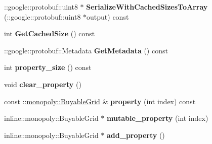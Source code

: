 \begin{DoxyCompactItemize}
\item 
\hypertarget{classmonopoly_1_1_all_buyable_grids_a4342c1c81350077923ce80b5f8d4b295}{}\+::google\+::protobuf\+::uint8 $\ast$ {\bfseries Serialize\+With\+Cached\+Sizes\+To\+Array} (\+::google\+::protobuf\+::uint8 $\ast$output) const \label{classmonopoly_1_1_all_buyable_grids_a4342c1c81350077923ce80b5f8d4b295}

\item 
\hypertarget{classmonopoly_1_1_all_buyable_grids_a085f9a1bea817b9ad8bcddb4b3563d4e}{}int {\bfseries Get\+Cached\+Size} () const \label{classmonopoly_1_1_all_buyable_grids_a085f9a1bea817b9ad8bcddb4b3563d4e}

\item 
\hypertarget{classmonopoly_1_1_all_buyable_grids_a6384be8b73639bafd30a27ace0cfaa51}{}\+::google\+::protobuf\+::\+Metadata {\bfseries Get\+Metadata} () const \label{classmonopoly_1_1_all_buyable_grids_a6384be8b73639bafd30a27ace0cfaa51}

\item 
\hypertarget{classmonopoly_1_1_all_buyable_grids_afc43e6a94966878f4352144d0b8df0bc}{}int {\bfseries property\+\_\+size} () const \label{classmonopoly_1_1_all_buyable_grids_afc43e6a94966878f4352144d0b8df0bc}

\item 
\hypertarget{classmonopoly_1_1_all_buyable_grids_aa57470222a73dd4b0b68c170d6b9b66e}{}void {\bfseries clear\+\_\+property} ()\label{classmonopoly_1_1_all_buyable_grids_aa57470222a73dd4b0b68c170d6b9b66e}

\item 
\hypertarget{classmonopoly_1_1_all_buyable_grids_ab9d35bc459c80a36f88f83d67cfa5617}{}const \+::\hyperlink{classmonopoly_1_1_buyable_grid}{monopoly\+::\+Buyable\+Grid} \& {\bfseries property} (int index) const \label{classmonopoly_1_1_all_buyable_grids_ab9d35bc459c80a36f88f83d67cfa5617}

\item 
\hypertarget{classmonopoly_1_1_all_buyable_grids_aef38898922e3006c2299342b67339005}{}inline\+::monopoly\+::\+Buyable\+Grid $\ast$ {\bfseries mutable\+\_\+property} (int index)\label{classmonopoly_1_1_all_buyable_grids_aef38898922e3006c2299342b67339005}

\item 
\hypertarget{classmonopoly_1_1_all_buyable_grids_acca717066b04c2ff957807e5f6702b70}{}inline\+::monopoly\+::\+Buyable\+Grid $\ast$ {\bfseries add\+\_\+property} ()\label{classmonopoly_1_1_all_buyable_grids_acca717066b04c2ff957807e5f6702b70}


\end{DoxyCompactItemize}
